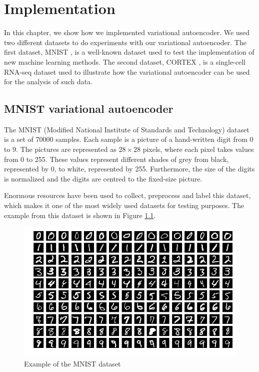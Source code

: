 \chapter{Implementation}
\label{chap:results}

In this chapter, we show how we implemented variational autoencoder.
We used two different datasets to do experiments with our variational autoencoder.
The first dataset, MNIST \cite{lecun1998gradient}, is a well-known dataset used to test the implementation of new machine learning methods.
The second dataset, CORTEX \cite{lopez2018scvi}, is a single-cell RNA-seq dataset used to illustrate how the variational autoencoder can be used for the analysis of such data.

\section{MNIST variational autoencoder}

The MNIST (Modified National Institute of Standards and Technology) dataset is a set of 70000 samples.
Each sample is a picture of a hand-written digit from 0 to 9.
The pictures are represented as $28\times28$ pixels, where each pixel takes values from 0 to 255.
These values represent different shades of grey from black, represented by 0, to white, represented by 255.
Furthermore, the size of the digits is normalized and the digits are centred to the fixed-size picture.

Enormous resources have been used to collect, preprocess and label this dataset, which makes it one of the most widely used datasets for testing purposes.
The example from this dataset is shown in Figure \ref{fig:MNIST_ex}.

\begin{figure}[H]
    \centering
    \includegraphics[scale=0.3]{images/MnistExamples.png}
    \caption{Example of the MNIST dataset}
    \label{fig:MNIST_ex}
\end{figure}

